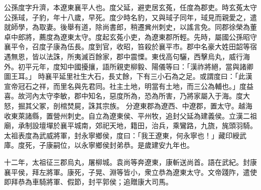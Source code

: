 
\begin{pinyinscope}

公孫度字升濟，本遼東襄平人也。度父延，避吏居玄菟，任度為郡吏。時玄菟太守公孫琙，子豹，年十八歲，早死。度少時名豹，又與琙子同年，琙見而親愛之，遣就師學，為取妻。後舉有道，除尚書郎，稍遷兾州刺史，以謠言免。同郡徐榮為董卓中郎將，薦度為遼東太守。度起玄菟小吏，為遼東郡所輕。先時，屬國公孫昭守襄平令，召度子康為伍長。度到官，收昭，笞殺於襄平市。郡中名豪大姓田韶等宿遇無恩，皆以法誅，所夷滅百餘家，郡中震慄。東伐高句驪，西擊烏丸，威行海外。初平元年，度知中國擾攘，語所親吏柳毅、陽儀等曰：「漢祚將絕，當與諸卿圖王耳。」
時襄平延里社生大石，長丈餘，下有三小石為之足。或謂度曰：「此漢宣帝冠石之祥，而里名與先君同。社主土地，明當有土地，而三公為輔也。」度益喜。故河內太守李敏，郡中知名，惡度所為，恐為所害，乃將家屬入于海。度大怒，掘其父冢，剖棺焚屍，誅其宗族。
分遼東郡為遼西、中遼郡，置太守。越海收東萊諸縣，置營州刺史。自立為遼東侯、平州牧，追封父延為建義侯。立漢二祖廟，承制設壇墠於襄平城南，郊祀天地，籍田，治兵，乘鸞路，九旒，旄頭羽騎。太祖表度為武威將軍，封永寧鄉侯，度曰：「我王遼東，何永寧也！」藏印綬武庫。度死，子康嗣位，以永寧鄉侯封弟恭。是歲建安九年也。

十二年，太祖征三郡烏丸，屠柳城。袁尚等奔遼東，康斬送尚首。語在武紀。封康襄平侯，拜左將軍。康死，子晃、淵等皆小，衆立恭為遼東太守。文帝踐阼，遣使即拜恭為車騎將軍、假節，封平郭侯；追贈康大司馬。


\end{pinyinscope}
